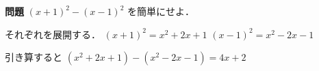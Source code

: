\textbf{問題} $(x+1)^2 - (x-1)^2$ を簡単にせよ．

それぞれを展開する．
$(x+1)^2 = x^2 + 2x + 1$
$(x-1)^2 = x^2 - 2x - 1$

引き算すると
$(x^2 + 2x + 1) - (x^2 - 2x - 1) = 4x + 2$
